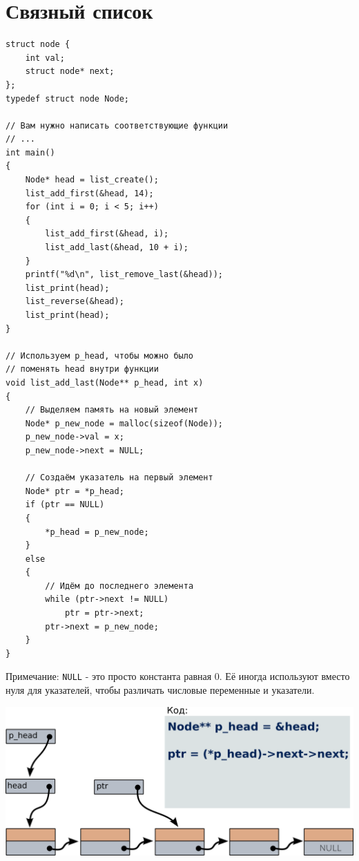 \documentclass{article}
\begin{document}
\section*{Связный список}
\begin{multicols}{2}
\begin{lstlisting}
struct node {
    int val;
    struct node* next;
};
typedef struct node Node;

// Вам нужно написать соответствующие функции
// ...
int main()
{
    Node* head = list_create();
    list_add_first(&head, 14);
    for (int i = 0; i < 5; i++)
    {
        list_add_first(&head, i);
        list_add_last(&head, 10 + i); 
    }
    printf("%d\n", list_remove_last(&head));
    list_print(head);
    list_reverse(&head);
    list_print(head);
}

// Используем p_head, чтобы можно было 
// поменять head внутри функции
void list_add_last(Node** p_head, int x)
{
    // Выделяем память на новый элемент
    Node* p_new_node = malloc(sizeof(Node));
    p_new_node->val = x;
    p_new_node->next = NULL;
    
    // Создаём указатель на первый элемент
    Node* ptr = *p_head;
    if (ptr == NULL)
    {
        *p_head = p_new_node;
    }
    else
    {
        // Идём до последнего элемента
        while (ptr->next != NULL)
            ptr = ptr->next;
        ptr->next = p_new_node;
    }
}   
\end{lstlisting}
\begin{center}
\end{center}
\end{multicols}
Примечание: \texttt{NULL} - это просто константа равная 0. Её иногда используют вместо нуля для указателей, чтобы различать числовые переменные и указатели.

\begin{center}
\includegraphics[scale=0.8]{../images/list.png}
\end{center}
\end{document}
